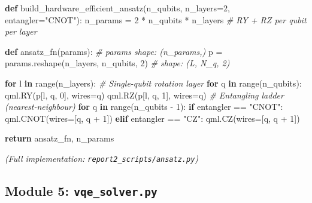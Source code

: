 \documentclass[
  11pt,
]{report}
\newenvironment{Shaded}{}{}
\newcommand{\BuiltInTok}[1]{\textcolor[rgb]{0.00,0.50,0.00}{#1}}
\newcommand{\CommentTok}[1]{\textcolor[rgb]{0.38,0.63,0.69}{\textit{#1}}}
\newcommand{\ControlFlowTok}[1]{\textcolor[rgb]{0.00,0.44,0.13}{\textbf{#1}}}
\newcommand{\DecValTok}[1]{\textcolor[rgb]{0.25,0.63,0.44}{#1}}
\newcommand{\KeywordTok}[1]{\textcolor[rgb]{0.00,0.44,0.13}{\textbf{#1}}}
\newcommand{\NormalTok}[1]{#1}
\newcommand{\OperatorTok}[1]{\textcolor[rgb]{0.40,0.40,0.40}{#1}}
\newcommand{\StringTok}[1]{\textcolor[rgb]{0.25,0.44,0.63}{#1}}
\begin{document}
\begin{Shaded}
\begin{Highlighting}[]
\KeywordTok{def}\NormalTok{ build\_hardware\_efficient\_ansatz(n\_qubits, n\_layers}\OperatorTok{=}\DecValTok{2}\NormalTok{, entangler}\OperatorTok{=}\StringTok{"CNOT"}\NormalTok{):}
\NormalTok{    n\_params }\OperatorTok{=} \DecValTok{2} \OperatorTok{*}\NormalTok{ n\_qubits }\OperatorTok{*}\NormalTok{ n\_layers      }\CommentTok{\# RY + RZ per qubit per layer}

    \KeywordTok{def}\NormalTok{ ansatz\_fn(params):                   }\CommentTok{\# params shape: (n\_params,)}
\NormalTok{        p }\OperatorTok{=}\NormalTok{ params.reshape(n\_layers, n\_qubits, }\DecValTok{2}\NormalTok{)  }\CommentTok{\# shape: (L, N\_q, 2)}

        \ControlFlowTok{for}\NormalTok{ l }\KeywordTok{in} \BuiltInTok{range}\NormalTok{(n\_layers):}
            \CommentTok{\# Single{-}qubit rotation layer}
            \ControlFlowTok{for}\NormalTok{ q }\KeywordTok{in} \BuiltInTok{range}\NormalTok{(n\_qubits):}
\NormalTok{                qml.RY(p[l, q, }\DecValTok{0}\NormalTok{], wires}\OperatorTok{=}\NormalTok{q)}
\NormalTok{                qml.RZ(p[l, q, }\DecValTok{1}\NormalTok{], wires}\OperatorTok{=}\NormalTok{q)}
            \CommentTok{\# Entangling ladder (nearest{-}neighbour)}
            \ControlFlowTok{for}\NormalTok{ q }\KeywordTok{in} \BuiltInTok{range}\NormalTok{(n\_qubits }\OperatorTok{{-}} \DecValTok{1}\NormalTok{):}
                \ControlFlowTok{if}\NormalTok{ entangler }\OperatorTok{==} \StringTok{"CNOT"}\NormalTok{:}
\NormalTok{                    qml.CNOT(wires}\OperatorTok{=}\NormalTok{[q, q }\OperatorTok{+} \DecValTok{1}\NormalTok{])}
                \ControlFlowTok{elif}\NormalTok{ entangler }\OperatorTok{==} \StringTok{"CZ"}\NormalTok{:}
\NormalTok{                    qml.CZ(wires}\OperatorTok{=}\NormalTok{[q, q }\OperatorTok{+} \DecValTok{1}\NormalTok{])}

    \ControlFlowTok{return}\NormalTok{ ansatz\_fn, n\_params}
\end{Highlighting}
\end{Shaded}

\emph{(Full implementation: \texttt{report2\_scripts/ansatz.py})}

\subsection{\texorpdfstring{Module 5:
\texttt{vqe\_solver.py}}{Module 5: vqe\_solver.py}}\label{module-5-vqe_solver.py}
\end{document}
